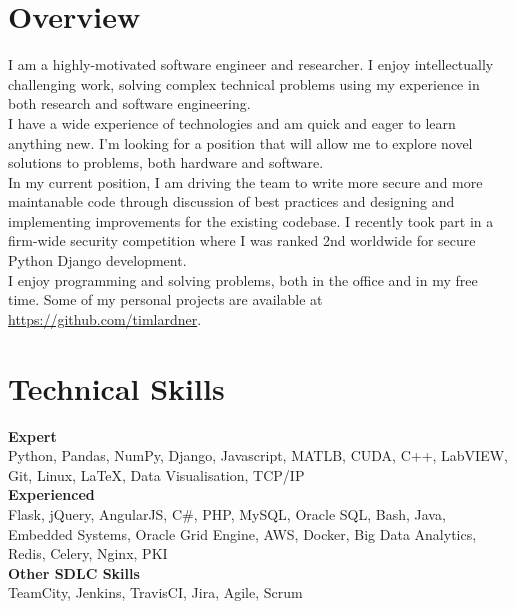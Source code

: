 
\section*{Overview}
I am a highly-motivated software engineer and researcher. I enjoy intellectually challenging work, solving complex technical problems using my experience in both research and software engineering.\\[5pt]

I have a wide experience of technologies and am quick and eager to learn anything new. I'm looking for a position that will allow me to explore novel solutions to problems, both hardware and software.\\[5pt]

In my current position, I am driving the team to write more secure and more maintanable code through discussion of best practices and designing and implementing improvements for the existing codebase. I recently took part in a firm-wide security competition where I was ranked 2nd worldwide for secure Python Django development.\\[5pt]

I enjoy programming and solving problems, both in the office and in my free time. Some of my personal projects are available at \url{https://github.com/timlardner}.

\section*{Technical Skills}
\textbf{Expert}\\
Python, Pandas, NumPy, Django, Javascript, MATLB, CUDA, C++, LabVIEW, Git, Linux, LaTeX, Data Visualisation, TCP/IP\\[5pt]
\textbf{Experienced}\\
Flask, jQuery, AngularJS, C\#, PHP, MySQL, Oracle SQL, Bash, Java, Embedded Systems, Oracle Grid Engine, AWS, Docker, Big Data Analytics, Redis, Celery, Nginx, PKI\\[5pt]
\textbf{Other SDLC Skills}\\
TeamCity, Jenkins, TravisCI, Jira, Agile, Scrum\\[5pt] 